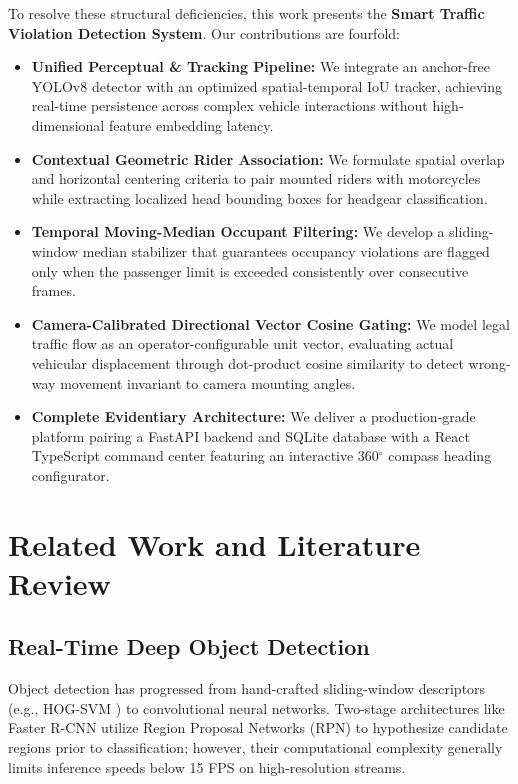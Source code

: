 \documentclass[conference]{IEEEtran}
\begin{document}
To resolve these structural deficiencies, this work presents the \textbf{Smart Traffic Violation Detection System}. Our contributions are fourfold:
\begin{itemize}
    \item \textbf{Unified Perceptual \& Tracking Pipeline:} We integrate an anchor-free YOLOv8 detector with an optimized spatial-temporal IoU tracker, achieving real-time persistence across complex vehicle interactions without high-dimensional feature embedding latency.
    \item \textbf{Contextual Geometric Rider Association:} We formulate spatial overlap and horizontal centering criteria to pair mounted riders with motorcycles while extracting localized head bounding boxes for headgear classification.
    \item \textbf{Temporal Moving-Median Occupant Filtering:} We develop a sliding-window median stabilizer that guarantees occupancy violations are flagged only when the passenger limit is exceeded consistently over consecutive frames.
    \item \textbf{Camera-Calibrated Directional Vector Cosine Gating:} We model legal traffic flow as an operator-configurable unit vector, evaluating actual vehicular displacement through dot-product cosine similarity to detect wrong-way movement invariant to camera mounting angles.
    \item \textbf{Complete Evidentiary Architecture:} We deliver a production-grade platform pairing a FastAPI backend and SQLite database with a React TypeScript command center featuring an interactive 360$^\circ$ compass heading configurator.
\end{itemize}

\section{Related Work and Literature Review}

\subsection{Real-Time Deep Object Detection}
Object detection has progressed from hand-crafted sliding-window descriptors (e.g., HOG-SVM \cite{dalal2005histograms}) to convolutional neural networks. Two-stage architectures like Faster R-CNN \cite{ren2017faster} utilize Region Proposal Networks (RPN) to hypothesize candidate regions prior to classification; however, their computational complexity generally limits inference speeds below 15 FPS on high-resolution streams.
\end{document}
